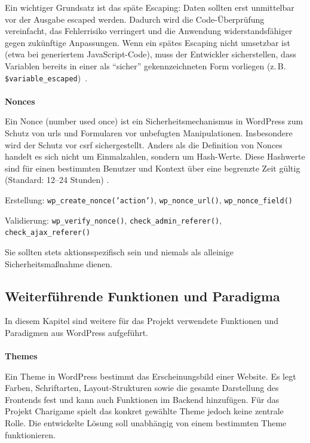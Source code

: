 Ein wichtiger Grundsatz ist das späte Escaping: Daten sollten erst unmittelbar vor der Ausgabe escaped werden.
Dadurch wird die Code-Überprüfung vereinfacht, das Fehlerrisiko verringert und die Anwendung widerstandsfähiger gegen zukünftige Anpassungen.
Wenn ein spätes Escaping nicht umsetzbar ist (etwa bei generiertem JavaScript-Code), muss der Entwickler sicherstellen, dass Variablen bereits in einer als \enquote{sicher} gekennzeichneten Form vorliegen (z.\,B. \texttt{\$variable\_escaped})~\cite{wordpress2024escapingcant}.
\\\\
\textbf{Nonces}

Ein Nonce (number used once) ist ein Sicherheitsmechanismus in WordPress zum Schutz von \gls{url}s und Formularen vor unbefugten Manipulationen.
Insbesondere wird der Schutz vor \gls{csrf} sichergestellt.
Anders als die Definition von Nonces handelt es sich nicht um Einmalzahlen, sondern um Hash-Werte.
Diese Hashwerte sind für einen bestimmten Benutzer und Kontext über eine begrenzte Zeit gültig (Standard: 12–24 Stunden) \cite{wordpress2024nonces}.

Erstellung: \texttt{wp\_create\_nonce('action')}, \texttt{wp\_nonce\_url()}, \texttt{wp\_nonce\_field()}

Validierung: \texttt{wp\_verify\_nonce()}, \texttt{check\_admin\_referer()}, \texttt{check\_ajax\_referer()}

Sie sollten stets aktionsspezifisch sein und niemals als alleinige Sicherheitsmaßnahme dienen.




\subsection{Weiterführende Funktionen und Paradigma}
In diesem Kapitel sind weitere für das Projekt verwendete Funktionen und Paradigmen aus WordPress aufgeführt.
\\
\\
\textbf{Themes}

Ein Theme in WordPress bestimmt das Erscheinungsbild einer Website.
Es legt Farben, Schriftarten, Layout-Strukturen sowie die gesamte Darstellung des Frontends fest und kann auch Funktionen im Backend hinzufügen. \cite{wordpress2024theme}
Für das Projekt Charigame spielt das konkret gewählte Theme jedoch keine zentrale Rolle.
Die entwickelte Lösung soll unabhängig von einem bestimmten Theme funktionieren.



